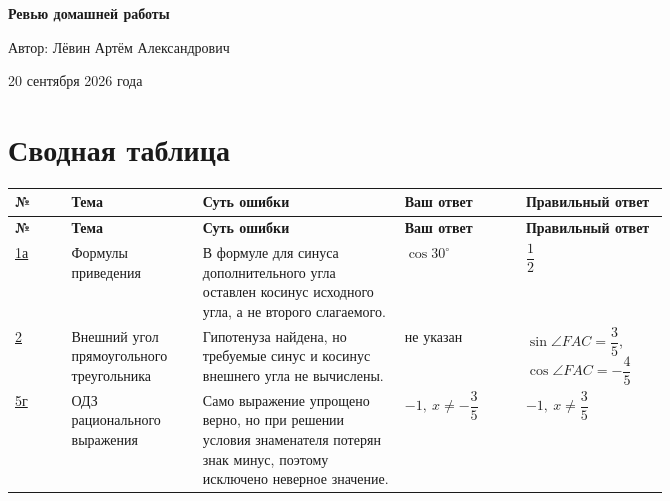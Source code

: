 \documentclass[12pt,a4paper]{article}
\begin{document}
\begin{titlepage}
\centering
\vspace*{0.25\textheight}

{\LARGE\bfseries Ревью домашней работы\par}

\vspace{2.2cm}

{\large Автор: Лёвин Артём Александрович\par}

\vspace{0.9cm}

{\large 20 сентября 2026 года\par}

\vfill


\vspace*{0.8cm}
\end{titlepage}

\newpage
\section*{Сводная таблица}

{\small
\begin{longtable}{
  >{\raggedright\arraybackslash}p{0.07\linewidth}
  >{\raggedright\arraybackslash}p{0.14\linewidth}
  >{\raggedright\arraybackslash}p{0.25\linewidth}
  >{\raggedright\arraybackslash}p{0.15\linewidth}
  >{\raggedright\arraybackslash}p{0.15\linewidth}}
\toprule
\textbf{№} & \textbf{Тема} & \textbf{Суть ошибки} & \textbf{Ваш ответ} & \textbf{Правильный ответ} \\
\midrule
\endfirsthead
\toprule
\textbf{№} & \textbf{Тема} & \textbf{Суть ошибки} & \textbf{Ваш ответ} & \textbf{Правильный ответ} \\
\midrule
\endhead
\hyperref[task:1a]{1а} &
Формулы приведения &
В формуле для синуса дополнительного угла оставлен косинус исходного угла, а не второго слагаемого. &
$\cos 30^\circ$ &
$\dfrac12$ \\
\addlinespace
\hyperref[task:2]{2} &
Внешний угол прямоугольного треугольника &
Гипотенуза найдена, но требуемые синус и косинус внешнего угла не вычислены. &
не указан &
$\sin\angle FAC=\dfrac35$, \newline
$\cos\angle FAC=-\dfrac45$ \\
\addlinespace
\hyperref[task:5d]{5г} &
ОДЗ рационального выражения &
Само выражение упрощено верно, но при решении условия знаменателя потерян знак минус, поэтому исключено неверное значение. &
$-1,\ x\ne-\dfrac35$ &
$-1,\ x\ne\dfrac35$ \\
\bottomrule
\end{longtable}
}
\end{document}
